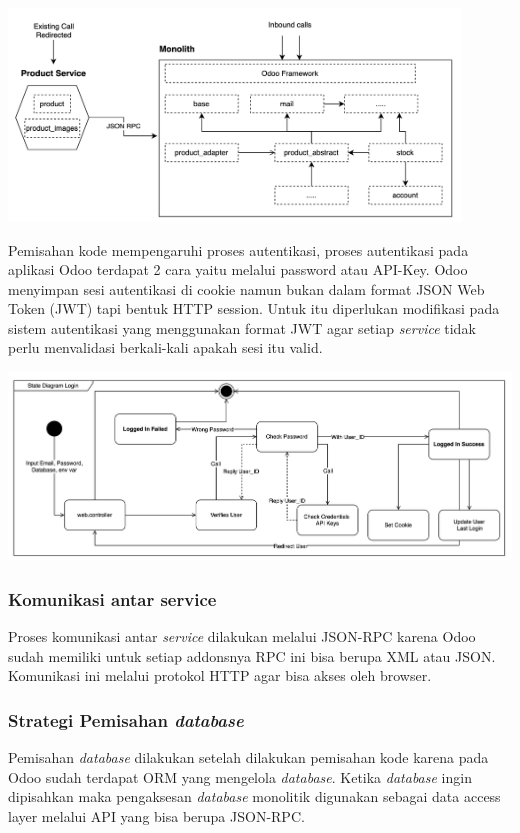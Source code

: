 \begin{center}
	\includegraphics[width=12cm]{img/bab_3/strangelExMicro.png}
	\label{fig:asd}
\end{center}

Pemisahan kode mempengaruhi proses autentikasi, proses autentikasi pada aplikasi Odoo terdapat 2 cara yaitu melalui password atau API-Key. Odoo menyimpan sesi autentikasi di cookie namun bukan dalam format JSON Web Token (JWT) tapi bentuk HTTP session. Untuk itu diperlukan modifikasi pada sistem autentikasi yang menggunakan format JWT agar setiap \textit{service} tidak perlu menvalidasi berkali-kali apakah sesi itu valid. 

\begin{center}
	\includegraphics[width=14cm]{img/bab_3/stateDiagramLogin.png}
	\label{fig:asd}
\end{center}


\subsubsection{Komunikasi antar service}
Proses komunikasi antar \textit{service} dilakukan melalui JSON-RPC karena Odoo sudah memiliki untuk setiap addonsnya RPC ini bisa berupa XML atau JSON. Komunikasi ini melalui protokol  HTTP agar bisa akses oleh browser.  
\\
\subsubsection{Strategi Pemisahan \textit{database}}
Pemisahan \textit{database} dilakukan setelah dilakukan pemisahan kode karena pada Odoo sudah terdapat ORM yang mengelola \textit{database}. Ketika \textit{database} ingin dipisahkan maka pengaksesan \textit{database} monolitik  digunakan sebagai data access layer melalui API yang bisa berupa JSON-RPC.
\\ 

